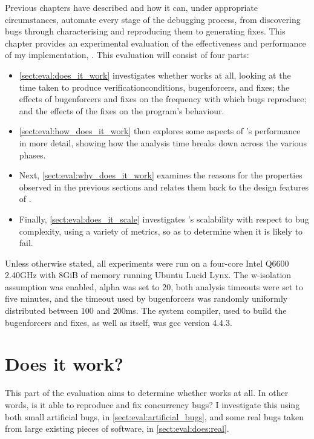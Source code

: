 \noindent
Previous chapters have described {\technique} and how it can, under
appropriate circumstances, automate every stage of the debugging
process, from discovering bugs through characterising and reproducing
them to generating fixes.  This chapter provides an experimental
evaluation of the effectiveness and performance of my implementation,
{\implementation}.  This evaluation will consist of four parts:
\begin{itemize}
\item \autoref{sect:eval:does_it_work} investigates whether
  {\technique} works at all, looking at the time taken to produce
  \glspl{verificationcondition}, \glspl{bugenforcer}, and fixes; the
  effects of \glspl{bugenforcer} and fixes on the frequency with which
  bugs reproduce; and the effects of the fixes on the program's
  behaviour.
\item \autoref{sect:eval:how_does_it_work} then explores some aspects
  of {\technique}'s performance in more detail, showing how the
  analysis time breaks down across the various phases.
\item Next, \autoref{sect:eval:why_does_it_work} examines the reasons
  for the properties observed in the previous sections and relates
  them back to the design features of {\technique}.
\item Finally, \autoref{sect:eval:does_it_scale} investigates
  {\technique}'s scalability with respect to bug complexity, using a
  variety of metrics, so as to determine when it is likely to fail.
\end{itemize}
Unless otherwise stated, all experiments were run on a four-core Intel
Q6600 2.40GHz with 8GiB of memory running Ubuntu Lucid Lynx.  The
\gls{w-isolation} assumption was enabled, \gls{alpha} was set to 20,
both analysis timeouts were set to five minutes, and the timeout used
by \glspl{bugenforcer} was randomly uniformly distributed between 100
and 200ms.  The system compiler, used to build the \glspl{bugenforcer}
and fixes, as well as {\implementation} itself, was gcc version 4.4.3.

\section{Does it work?}
\label{sect:eval:does_it_work}

This part of the evaluation aims to determine whether {\technique}
works at all.  In other words, is it able to reproduce and fix
concurrency bugs?  I investigate this using both small artificial
bugs, in \autoref{sect:eval:artificial_bugs}, and some real bugs taken
from large existing pieces of software, in
\autoref{sect:eval:does:real}.

